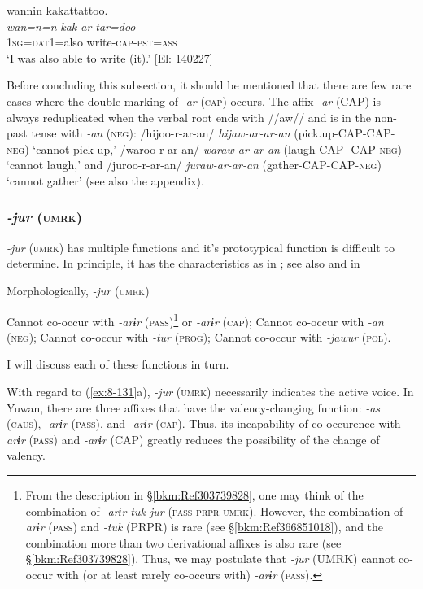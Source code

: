 \ex
{\TM}
\glll  wannin  kakattattoo.\\
\textit{wan=n=n}  \textit{kak-ar-tar=doo}\\
1\textsc{sg}=\textsc{dat1}=also  write-\textsc{cap}-\textsc{pst}=\textsc{ass}\\
\glt ‘I was also able to write (it).’ [El: 140227]
\z
\z

  Before concluding this subsection, it should be mentioned that there are few rare cases where the double marking of \textit{-ar} (\textsc{cap}) occurs. The affix \textit{-ar} (CAP) is always reduplicated when the verbal root ends with //aw// and is in the non-past tense with \textit{-an} (\textsc{neg}): /hijoo-r-ar-an/ \textit{hijaw-ar-ar-an} (pick.up-CAP-CAP-\textsc{neg}) ‘cannot pick up,’ /waroo-r-ar-an/ \textit{waraw-ar-ar-an} (laugh-CAP- CAP-\textsc{neg}) ‘cannot laugh,’ and /juroo-r-ar-an/ \textit{juraw-ar-ar-an} (gather-CAP-CAP-\textsc{neg}) ‘cannot gather’ (see also the appendix).

\subsubsection{\textit{-jur} (\textsc{umrk})}

\textit{-jur} (\textsc{umrk}) has multiple functions and it’s prototypical function is difficult to determine. In principle, it has the characteristics as in ; see also  and  in 

\ea\label{ex:8-131}
  Morphologically, \textit{-jur} (\textsc{umrk})

\ea Cannot co-occur with \textit{-arɨr} (\textsc{pass})\footnote{From the description in §\ref{bkm:Ref303739828}, one may think of the combination of \textit{-arɨr-tuk-jur} (\textsc{pass}-\textsc{prpr}-\textsc{umrk}). However, the combination of \textit{-arɨr} (\textsc{pass}) and \textit{-tuk} (PRPR) is rare (see §\ref{bkm:Ref366851018}), and the combination more than two derivational affixes is also rare (see §\ref{bkm:Ref303739828}). Thus, we may postulate that \textit{-jur} (UMRK) cannot co-occur with (or at least rarely co-occurs with) \textit{-arɨr} (\textsc{pass}).} or \textit{-arɨr} (\textsc{cap});
\ex Cannot co-occur with \textit{-an} (\textsc{neg});
\ex Cannot co-occur with \textit{-tur} (\textsc{prog});
\ex Cannot co-occur with \textit{-jawur} (\textsc{pol}).
\z
\z

I will discuss each of these functions in turn.

With regard to (\ref{ex:8-131}a), \textit{-jur} (\textsc{umrk}) necessarily indicates the active voice. In Yuwan, there are three affixes that have the valency-changing function: \textit{-as} (\textsc{caus}), \textit{-arɨr} (\textsc{pass}), and \textit{-arɨr} (\textsc{cap}). Thus, its incapability of co-occurence with \textit{-arɨr} (\textsc{pass}) and \textit{-arɨr} (CAP) greatly reduces the possibility of the change of valency.

